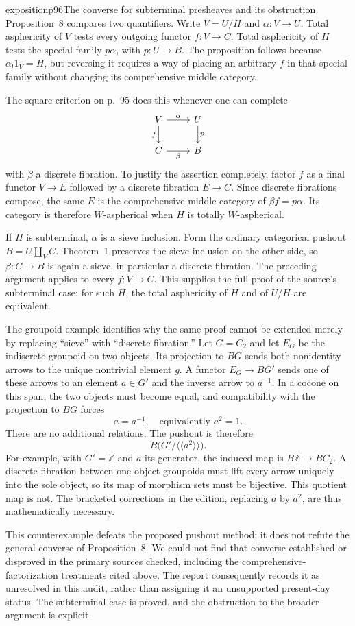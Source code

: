 \begin{dcomment}{exposition}{p96}{The converse for subterminal presheaves and its obstruction}
Proposition~8 compares two quantifiers. Write $V=U/H$ and $\alpha:V\to U$. Total asphericity of $V$ tests every outgoing functor $f:V\to C$. Total asphericity of $H$ tests the special family $p\alpha$, with $p:U\to B$. The proposition follows because $\alpha_!1_V=H$, but reversing it requires a way of placing an arbitrary $f$ in that special family without changing its comprehensive middle category.

The square criterion on p.~95 does this whenever one can complete
\[
\begin{tikzcd}
V\arrow[r,"\alpha"]\arrow[d,"f"']&U\arrow[d,"p"]\\
C\arrow[r,"\beta"']&B
\end{tikzcd}
\]
with $\beta$ a discrete fibration. To justify the assertion completely, factor $f$ as a final functor $V\to E$ followed by a discrete fibration $E\to C$. Since discrete fibrations compose, the same $E$ is the comprehensive middle category of $\beta f=p\alpha$. Its category is therefore $W$-aspherical when $H$ is totally $W$-aspherical.

If $H$ is subterminal, $\alpha$ is a sieve inclusion. Form the ordinary categorical pushout $B=U\amalg_V C$. Theorem~1 preserves the sieve inclusion on the other side, so $\beta:C\to B$ is again a sieve, in particular a discrete fibration. The preceding argument applies to every $f:V\to C$. This supplies the full proof of the source's subterminal case: for such $H$, the total asphericity of $H$ and of $U/H$ are equivalent.

The groupoid example identifies why the same proof cannot be extended merely by replacing ``sieve'' with ``discrete fibration.'' Let $G=C_2$ and let $E_G$ be the indiscrete groupoid on two objects. Its projection to $BG$ sends both nonidentity arrows to the unique nontrivial element $g$. A functor $E_G\to BG'$ sends one of these arrows to an element $a\in G'$ and the inverse arrow to $a^{-1}$. In a cocone on this span, the two objects must become equal, and compatibility with the projection to $BG$ forces
\[
a=a^{-1},\quad\text{equivalently }a^2=1.
\]
There are no additional relations. The pushout is therefore
\[
B\bigl(G'/\langle\!\langle a^2\rangle\!\rangle\bigr).
\]
For example, with $G'=\mathbb Z$ and $a$ its generator, the induced map is $B\mathbb Z\to BC_2$. A discrete fibration between one-object groupoids must lift every arrow uniquely into the sole object, so its map of morphism sets must be bijective. This quotient map is not. The bracketed corrections in the edition, replacing $a$ by $a^2$, are thus mathematically necessary.

This counterexample defeats the proposed pushout method; it does not refute the general converse of Proposition~8. We could not find that converse established or disproved in the primary sources checked, including the comprehensive-factorization treatments cited above. The report consequently records it as unresolved in this audit, rather than assigning it an unsupported present-day status. The subterminal case is proved, and the obstruction to the broader argument is explicit.
\end{dcomment}

